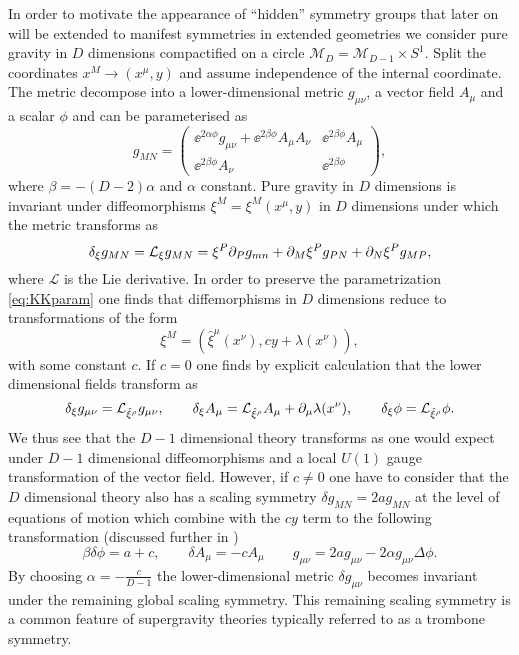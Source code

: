 In order to motivate the appearance of ``hidden'' symmetry groups that later on will be extended to manifest symmetries in extended geometries we consider pure gravity in $D$ dimensions compactified on a circle $\mathcal{M}_D = \mathcal{M}_{D-1}\times S^1$. Split the coordinates $x^M\to (x^\mu,y)$ and assume independence of the internal coordinate. The metric decompose into a lower-dimensional metric $g_{\mu\nu}$, a vector field $A_\mu$ and a scalar $\phi$ and can be parameterised as
\begin{equation}\label{eq:KKparam}
    g_{MN} = \left(\begin{array}{c|c}
                \ee^{2\alpha\phi}g_{\mu\nu}+\ee^{2\beta\phi}A_\mu A_\nu & \ee^{2\beta\phi}A_\mu\\\hline \ee^{2\beta\phi}A_\nu& \ee^{2\beta\phi}
             \end{array}\right),
\end{equation}
where $\beta=-(D-2)\alpha$ and $\alpha$ constant. Pure gravity in $D$ dimensions is invariant under diffeomorphisms $\xi^M=\xi^M(x^\mu,y)$ in $D$ dimensions under which the metric transforms as 
\begin{equation}
    \delta_\xi g_{MN} = \mathcal{L}_\xi g_{MN} = \xi^P\partial_Pg_{mn}+\partial_{M}\xi^Pg_{PN}+\partial_{N}\xi^Pg_{MP},
\end{equation}
where $\mathcal{L}$ is the Lie derivative. In order to preserve the parametrization \eqref{eq:KKparam} one finds that diffemorphisms in $D$ dimensions reduce to transformations of the form
\begin{equation}
    \xi^M = \left(\hat{\xi}^\mu(x^\nu),cy+\lambda(x^\nu)\right),
\end{equation}
with some constant $c$. If $c=0$ one finds by explicit calculation that the lower dimensional fields transform as 
\begin{equation}
    \delta_\xi g_{\mu\nu} = \mathcal{L}_{\hat{\xi}^\rho}g_{\mu\nu},\qquad \delta_\xi A_\mu = \mathcal{L}_{\hat{\xi}^\rho}A_{\mu}+\partial_\mu\lambda(x^\nu), \qquad \delta_\xi \phi = \mathcal{L}_{\hat{\xi}^\rho}\phi.
\end{equation}
We thus see that the $D-1$ dimensional theory transforms as one would expect under $D-1$ dimensional diffeomorphisms and a local $U(1)$ gauge transformation of the vector field. However, if $c\neq 0$ one have to consider that the $D$ dimensional theory also has a scaling symmetry $\delta g_{MN}= 2ag_{MN}$ at the level of equations of motion which combine with the $cy$ term to the following transformation (discussed further in \cite{PopeKaluzaKlein})
\begin{equation}
    \beta \delta\phi = a+c,\qquad \delta A_\mu = -cA_\mu\qquad g_{\mu\nu} = 2ag_{\mu\nu}-2\alpha g_{\mu\nu}\Delta\phi.
\end{equation}
By choosing $\alpha = -\frac{c}{D-1}$ the lower-dimensional metric $\delta g_{\mu\nu}$ becomes invariant under the remaining global scaling symmetry. This remaining scaling symmetry is a common feature of supergravity theories typically referred to as a trombone symmetry. 

